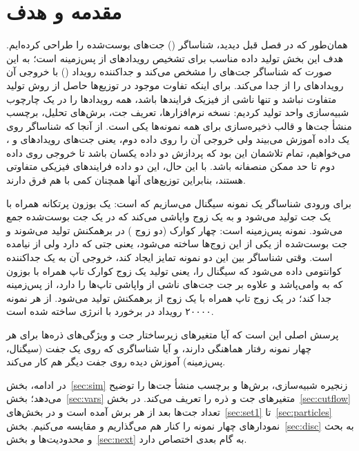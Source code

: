 \section{مقدمه و هدف}
\label{sec:intro}
همان‌طور که در فصل قبل دیدید، شناساگر () جت‌های بوست‌شده \Zbb را طراحی کرده‌ایم. هدف این بخش تولید داده مناسب برای تشخیص رویدادهای \ttZ از پس‌زمینه \ttbb است؛ به این صورت که شناساگر جت‌های \Zbos{} را مشخص می‌کند و جداکننده رویداد () با خروجی آن رویدادهای \ttZ را از \ttbb جدا می‌کند. برای اینکه تفاوت موجود در توزیع‌ها حاصل از روش تولید متفاوت نباشد و تنها ناشی از فیزیک فرایندها باشد، همه رویدادها را در یک چارچوب شبیه‌سازی واحد تولید کردیم: نسخه نرم‌افزارها، تعریف جت، برش‌های تحلیل، برچسب منشأ جت‌ها و قالب ذخیره‌سازی برای همه نمونه‌ها یکی است. از آنجا که شناساگر روی یک داده آموزش می‌بیند ولی خروجی آن را روی داده دوم، یعنی جت‌های رویدادهای \ttZ و \ttbb، می‌خواهیم، تمام تلاشمان این بود که پردازش دو داده یکسان باشد تا خروجی روی داده دوم تا حد ممکن منصفانه باشد. با این حال، این دو داده فرایندهای فیزیکی متفاوتی هستند، بنابراین توزیع‌های آنها همچنان کمی با هم فرق دارند.

برای ورودی شناساگر \Zbos{} یک نمونه سیگنال می‌سازیم که \Zjet است: یک بوزون \Zbos{} پرتکانه همراه با یک جت تولید می‌شود و \Zbos{} به یک زوج \bb واپاشی می‌کند که در یک جت بوست‌شده جمع می‌شود. نمونه پس‌زمینه \bbbb است: چهار کوارک \bq{} (دو زوج \bb) در برهمکنش  تولید می‌شوند و جت بوست‌شده از یکی از این زوج‌ها ساخته می‌شود، یعنی جتی که \bb دارد ولی از \Zbos{} نیامده است. وقتی شناساگر \Zbos{} بین این دو نمونه تمایز ایجاد کند، خروجی آن به یک جداکننده کوانتومی داده می‌شود که سیگنال \ttZ را، یعنی تولید یک زوج کوارک تاپ همراه با بوزون \Zbos{} که به \bb وامی‌پاشد و علاوه بر جت \Zbos{} جت‌های ناشی از واپاشی تاپ‌ها را دارد، از پس‌زمینه \ttbb جدا کند؛ در \ttbb یک زوج تاپ همراه با یک زوج \bb از برهمکنش  تولید می‌شود. از هر نمونه ۲۰۰۰۰ رویداد در برخورد  با انرژی  ساخته شده است.

پرسش اصلی این است که آیا متغیرهای زیرساختار جت و ویژگی‌های ذره‌ها برای هر چهار نمونه رفتار هماهنگی دارند، و آیا شناساگری که روی یک جفت (سیگنال، پس‌زمینه) آموزش دیده روی جفت دیگر هم کار می‌کند.

در ادامه، بخش~\ref{sec:sim} زنجیره شبیه‌سازی، برش‌ها و برچسب منشأ جت‌ها را توضیح می‌دهد؛ بخش~\ref{sec:vars} متغیرهای جت و ذره را تعریف می‌کند. در بخش~\ref{sec:cutflow} تعداد جت‌ها بعد از هر برش آمده است و در بخش‌های~\ref{sec:set1} تا~\ref{sec:particles} نمودارهای چهار نمونه را کنار هم می‌گذاریم و مقایسه می‌کنیم. بخش~\ref{sec:disc} به بحث و محدودیت‌ها و بخش~\ref{sec:next} به گام بعدی اختصاص دارد.
